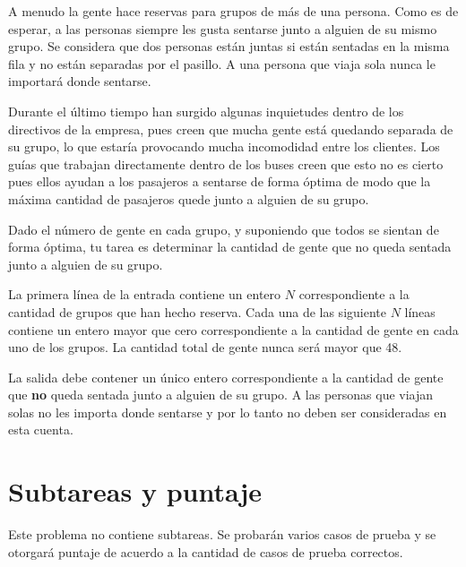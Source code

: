 \documentclass{oci}
\begin{document}
\begin{problemDescription}
\begin{center}
  \end{center}
  \vspace{-9em}
  A menudo la gente hace reservas para grupos de más de una persona.
  Como es de esperar, a las personas siempre les gusta sentarse junto a alguien
  de su mismo grupo.
  Se considera que dos personas están juntas si están sentadas en la misma fila
  y no están separadas por el pasillo.
  A una persona que viaja sola nunca le importará donde sentarse.

  Durante el último tiempo han surgido algunas inquietudes dentro de los
  directivos de la empresa, pues creen que mucha gente está quedando separada de
  su grupo, lo que estaría provocando mucha incomodidad entre los clientes.
  Los guías que trabajan directamente dentro de los buses creen que esto no es
  cierto pues ellos ayudan a los pasajeros a sentarse de forma óptima de modo
  que la máxima cantidad de pasajeros quede junto a alguien de su grupo.

  Dado el número de gente en cada grupo, y suponiendo que todos se sientan de
  forma óptima, tu tarea es determinar la cantidad de gente que no queda sentada
  junto a alguien de su grupo.
  
\end{problemDescription}

\begin{inputDescription}
  La primera línea de la entrada contiene un entero $N$ correspondiente a la
  cantidad de grupos que han hecho reserva.
  Cada una de las siguiente $N$ líneas contiene un entero mayor que cero
  correspondiente a la cantidad de gente en cada uno de los grupos.
  La cantidad total de gente nunca será mayor que 48.
\end{inputDescription}

\begin{outputDescription}
  La salida debe contener un único entero correspondiente a la cantidad de
  gente que \textbf{no} queda sentada junto a alguien de su grupo.
  A las personas que viajan solas no les importa donde sentarse y por lo tanto
  no deben ser consideradas en esta cuenta.
\end{outputDescription}

\section*{Subtareas y puntaje}
Este problema no contiene subtareas.
Se probarán varios casos de prueba y se otorgará puntaje de acuerdo a la
cantidad de casos de prueba correctos.

\begin{sampleDescription}
\end{sampleDescription}
\end{document}
